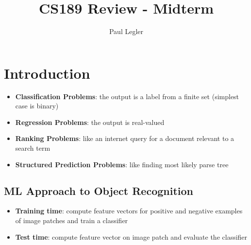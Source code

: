 \documentclass{article}
\title{CS189 Review - Midterm}
\author{Paul Legler}
\begin{document}
\maketitle
\tableofcontents
\newpage
\section{Introduction}
\begin{itemize}
\item \textbf{Classification Problems}: the output is a label from a finite set (simplest case is binary)
\item \textbf{Regression Problems}: the output is real-valued
\item \textbf{Ranking Problems}: like an internet query for a document relevant to a search term
\item \textbf{Structured Prediction Problems}: like finding most likely parse tree
\end{itemize}
\subsection{ML Approach to Object Recognition}
\begin{itemize}
\item \textbf{Training time}: compute feature vectors for positive and negative examples of image patches and train a classifier
\item \textbf{Test time}: compute feature vector on image patch and evaluate the classifier
\end{itemize}
\end{document}
